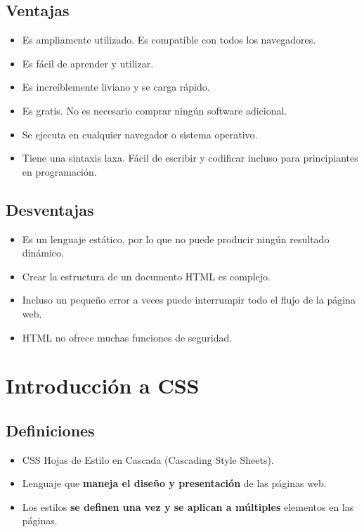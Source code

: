 \documentclass[a4paper,12pt]{article}
\begin{document}
\subsection*{Ventajas}

\begin{itemize}
    \item Es ampliamente utilizado. Es compatible con todos los navegadores.
    \item Es fácil de aprender y utilizar.
    \item Es increíblemente liviano y se carga rápido.
    \item Es gratis. No es necesario comprar ningún software adicional.
    \item Se ejecuta en cualquier navegador o sistema operativo.
    \item Tiene una sintaxis laxa. Fácil de escribir y codificar incluso para principiantes en programación.
\end{itemize}

\subsection*{Desventajas}

\begin{itemize}
    \item Es un lenguaje estático, por lo que no puede producir ningún resultado dinámico.
    \item Crear la estructura de un documento HTML es complejo.
    \item Incluso un pequeño error a veces puede interrumpir todo el flujo de la página web.
    \item HTML no ofrece muchas funciones de seguridad.
\end{itemize}


\section{Introducción a CSS}

\subsection*{Definiciones}
\begin{itemize}
    \item CSS Hojas de Estilo en Cascada (Cascading Style Sheets).
    \item Lenguaje que \textbf{maneja el diseño y presentación} de las páginas web.
    \item Los estilos \textbf{se definen una vez y se aplican a múltiples} elementos en las páginas.    
\end{itemize}
\end{document}
